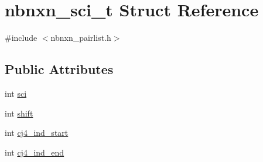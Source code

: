 \hypertarget{structnbnxn__sci__t}{\section{nbnxn\-\_\-sci\-\_\-t \-Struct \-Reference}
\label{structnbnxn__sci__t}
}


{\ttfamily \#include $<$nbnxn\-\_\-pairlist.\-h$>$}

\subsection*{\-Public \-Attributes}
\begin{DoxyCompactItemize}
\item 
int \hyperlink{structnbnxn__sci__t_aa2075cfcd1414a72f7e477b57cdad4e4}{sci}
\item 
int \hyperlink{structnbnxn__sci__t_a675754940450d119942436a3a7827abf}{shift}
\item 
int \hyperlink{structnbnxn__sci__t_ae80b28fc308472768828c2b24383aa6c}{cj4\-\_\-ind\-\_\-start}
\item 
int \hyperlink{structnbnxn__sci__t_a4dafffcb490ffb9ff27cb0ebbabcde81}{cj4\-\_\-ind\-\_\-end}
\end{DoxyCompactItemize}


